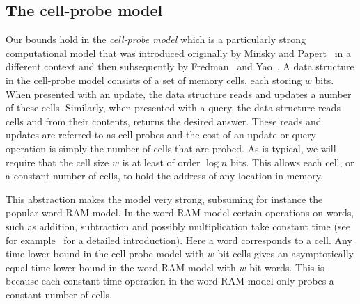\documentclass[11pt]{article}
\numberwithin{equation}{section}
\theoremstyle{definition}
\theoremstyle{plain}
\begin{document}
\subsection{The cell-probe model}

Our bounds hold in the \emph{cell-probe model} which is a particularly strong computational model that was introduced originally by Minsky and Papert~\cite{MP:1969} in a different context and then subsequently by Fredman~\cite{Fredman:1978} and Yao~\cite{Yao1981:Tables}. A data structure in the cell-probe model consists of a set of memory cells, each storing $w$ bits. When presented with an update, the data structure reads and updates a number of these cells. Similarly, when presented with a query, the data structure reads cells and from their contents, returns the desired answer. These reads and updates are referred to as cell probes and the cost of an update or query operation is simply the number of cells that are probed. As is typical, we will require that the cell size $w$ is at least of order $\log n$ bits. This allows each cell, or a constant number of cells, to hold the address of any location in memory.


This abstraction makes the model very strong, subsuming for instance the popular word-RAM model. In the word-RAM model certain operations on words, such as addition, subtraction and possibly multiplication take constant time (see for example~\cite{Hagerup:1998} for a detailed introduction). Here a word corresponds to a cell. Any time lower bound in the cell-probe model with
%
$w$-bit    %
cells gives an asymptotically equal time lower bound in the word-RAM model with
%
$w$-bit    %
words. This is because each 
%
constant-time    %
operation in the word-RAM model only probes a constant number of cells.
\end{document}
